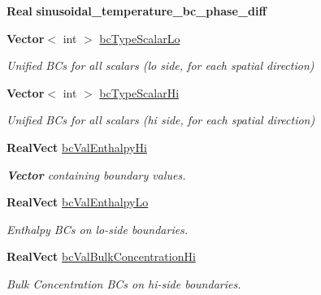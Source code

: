 \begin{DoxyCompactItemize}
\textbf{ Real} {\bfseries sinusoidal\+\_\+temperature\+\_\+bc\+\_\+phase\+\_\+diff}
\item 
\mbox{\label{class_mushy_layer_params_a9f6c79192f3543f76536ee658717dd9c}} 
\textbf{ Vector}$<$ int $>$ \hyperlink{class_mushy_layer_params_a9f6c79192f3543f76536ee658717dd9c}{bc\+Type\+Scalar\+Lo}
\begin{DoxyCompactList}\small\item\em Unified B\+Cs for all scalars (lo side, for each spatial direction) \end{DoxyCompactList}\item 
\mbox{\label{class_mushy_layer_params_a0967dab260886cd49012d03cd38bb0fd}} 
\textbf{ Vector}$<$ int $>$ \hyperlink{class_mushy_layer_params_a0967dab260886cd49012d03cd38bb0fd}{bc\+Type\+Scalar\+Hi}
\begin{DoxyCompactList}\small\item\em Unified B\+Cs for all scalars (hi side, for each spatial direction) \end{DoxyCompactList}\item 
\textbf{ Real\+Vect} \hyperlink{class_mushy_layer_params_a54544cff481fc73b80114133caeb08f4}{bc\+Val\+Enthalpy\+Hi}
\begin{DoxyCompactList}\small\item\em \textbf{ Vector} containing boundary values. \end{DoxyCompactList}\item 
\mbox{\label{class_mushy_layer_params_a7c6879d90958f9798389e497779cecbc}} 
\textbf{ Real\+Vect} \hyperlink{class_mushy_layer_params_a7c6879d90958f9798389e497779cecbc}{bc\+Val\+Enthalpy\+Lo}
\begin{DoxyCompactList}\small\item\em Enthalpy B\+Cs on lo-\/side boundaries. \end{DoxyCompactList}\item 
\mbox{\label{class_mushy_layer_params_a10f2afe241fb5442559ae32da03ace73}} 
\textbf{ Real\+Vect} \hyperlink{class_mushy_layer_params_a10f2afe241fb5442559ae32da03ace73}{bc\+Val\+Bulk\+Concentration\+Hi}
\begin{DoxyCompactList}\small\item\em Bulk Concentration B\+Cs on hi-\/side boundaries. \end{DoxyCompactList}\item 

\end{DoxyCompactItemize}
